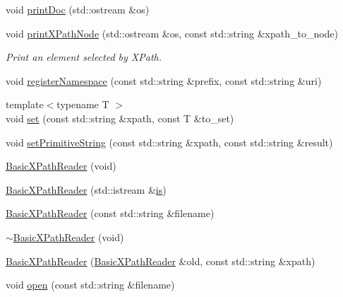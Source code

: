 \begin{DoxyCompactItemize}
void \mbox{\hyperlink{classXMLXPathReader_1_1BasicXPathReader_ab4607adfbae13b0ce3c7e5b944342207}{print\+Doc}} (std\+::ostream \&os)
\item 
void \mbox{\hyperlink{classXMLXPathReader_1_1BasicXPathReader_afba694dbda7c2e1c26ca344085bfffb6}{print\+X\+Path\+Node}} (std\+::ostream \&os, const std\+::string \&xpath\+\_\+to\+\_\+node)
\begin{DoxyCompactList}\small\item\em Print an element selected by X\+Path. \end{DoxyCompactList}\item 
void \mbox{\hyperlink{classXMLXPathReader_1_1BasicXPathReader_a5991605f4cda926b146829be5798b037}{register\+Namespace}} (const std\+::string \&prefix, const std\+::string \&uri)
\item 
{\footnotesize template$<$typename T $>$ }\\void \mbox{\hyperlink{classXMLXPathReader_1_1BasicXPathReader_a4cf7407f107bf4f307b70af4cccbd30e}{set}} (const std\+::string \&xpath, const T \&to\+\_\+set)
\item 
void \mbox{\hyperlink{classXMLXPathReader_1_1BasicXPathReader_a76d2a9f9bc292c92558619e47b85dd4c}{set\+Primitive\+String}} (const std\+::string \&xpath, const std\+::string \&result)
\item 
\mbox{\hyperlink{classXMLXPathReader_1_1BasicXPathReader_aeb14ab4d5064a3d2f5e0be7b41da1ab4}{Basic\+X\+Path\+Reader}} (void)
\item 
\mbox{\hyperlink{classXMLXPathReader_1_1BasicXPathReader_ae5addb82da0617e706a5c8879b0b2202}{Basic\+X\+Path\+Reader}} (std\+::istream \&\mbox{\hyperlink{x_8cc_a81abbbdef81e25584a2eab888e643d3d}{is}})
\item 
\mbox{\hyperlink{classXMLXPathReader_1_1BasicXPathReader_a57cb0e2be2731944bc6a04cd9074676e}{Basic\+X\+Path\+Reader}} (const std\+::string \&filename)
\item 
\mbox{\hyperlink{classXMLXPathReader_1_1BasicXPathReader_a68ea0f431941d0c9d1a0272866ae74d5}{$\sim$\+Basic\+X\+Path\+Reader}} (void)
\item 
\mbox{\hyperlink{classXMLXPathReader_1_1BasicXPathReader_aa3addfb7d74ed5930b9d2c0b55216227}{Basic\+X\+Path\+Reader}} (\mbox{\hyperlink{classXMLXPathReader_1_1BasicXPathReader}{Basic\+X\+Path\+Reader}} \&old, const std\+::string \&xpath)
\item 
void \mbox{\hyperlink{classXMLXPathReader_1_1BasicXPathReader_a0c3b7c392c0646fe682af255a0242a8c}{open}} (const std\+::string \&filename)
\item 

\end{DoxyCompactItemize}
